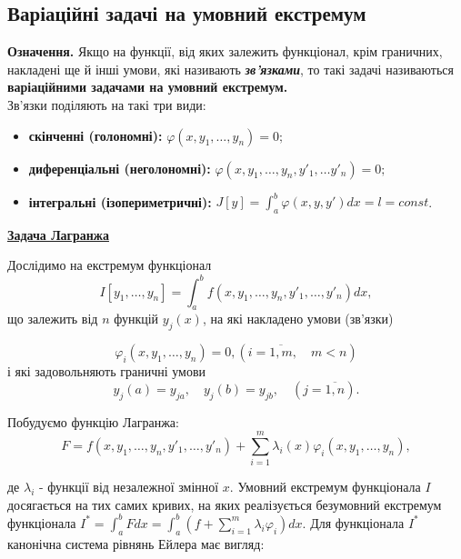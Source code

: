 \documentclass[a4paper]{article}
\begin{document}
	\subsection{Варіаційні задачі на умовний екстремум}

	\textbf{Означення.} Якщо на функції, від яких залежить функціонал, крім граничних, накладені ще й інші умови,
	які називають \textbf{\textit{зв’язками}}, то такі задачі називаються \textbf{варіаційними задачами на умовний екстремум.} \\
	Зв’язки поділяють на такі три види: 
	\begin{itemize}
		\item \textbf{скінченні (голономні):} $\varphi(x, y_1,\ldots, y_n) = 0;$

		\item \textbf{диференціальні (неголономні):}
			$\varphi(x, y_1, \ldots, y_n, y'_1, \ldots y'_n) = 0;$

		\item \textbf{інтегральні (ізопериметричні):} 
			$J[y] = \int_{a}^{b} \varphi(x, y, y')dx = l = const$.
	\end{itemize}

	\begin{center}
		\underline{\textbf{Задача Лагранжа}}
	\end{center}

	Дослідимо на екстремум функціонал
	\begin{equation}
		I[y_1, \ldots, y_n] = \int_{a}^{b} f(x, y_1, \ldots, y_n, y'_1, \ldots, y'_n)dx,
	\end{equation}
	що залежить від $n$ функцій $y_j(x)$, на які накладено умови (зв’язки)
	
	$$\varphi_i(x, y_1, \ldots, y_n) = 0, (i = \overline{1,m}, \quad m < n)$$
	і які задовольняють граничні умови
	$$y_j(a) = y_{ja}, \quad y_j(b) = y_{jb}, \quad (j=\overline{1,n}).$$
	
	Побудуємо функцію Лагранжа:
	\begin{equation}
		F = f(x, y_1, \ldots, y_n, y'_1, \ldots, y'_n) + 
		\sum_{i=1}^{m} \lambda_i(x) \varphi_i(x, y_1, \ldots, y_n),    			
	\end{equation}				      

	де $\lambda_i$ - функції від незалежної змінної $x$. Умовний екстремум функціонала $I$
	досягається на тих самих кривих, на яких реалізується безумовний екстремум функціонала
	$I^{*} = \int_{a}^{b} Fdx = \int_{a}^{b} \left(f + \sum_{i=1}^{m} \lambda_i \varphi_i \right)dx$.
	Для функціонала $I^{*}$ канонічна система рівнянь Ейлера має вигляд:
	
\end{document}
